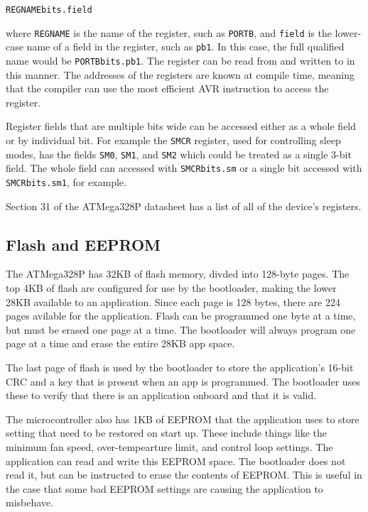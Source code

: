\documentclass{article}
\begin{document}
\texttt{REGNAMEbits.field}

where \texttt{REGNAME} is the name of the register, such as \texttt{PORTB}, and \texttt{field} is the
lower-case name of a field in the register, such as \texttt{pb1}.  In this case, the full qualified
name would be \texttt{PORTBbits.pb1}.  The register can be read from and written to in this manner.
The addresses of the registers are known at compile time, meaning that the compiler can use the most
efficient AVR instruction to access the register.

Register fields that are multiple bits wide can be accessed either as a whole field or by individual
bit.  For example the \texttt{SMCR} register, used for controlling sleep modes, has the fields
\texttt{SM0}, \texttt{SM1}, and \texttt{SM2} which could be treated as a single 3-bit field.  The
whole field can accessed with \texttt{SMCRbits.sm} or a single bit accessed with
\texttt{SMCRbits.sm1}, for example.

Section 31 of the ATMega328P datasheet has a list of all of the device's registers.

\subsection{Flash and EEPROM} \label{ssec:FWflasheeprom}
The ATMega328P has 32KB of flash memory, divded into 128-byte pages.  The top 4KB of flash are
configured for use by the bootloader, making the lower 28KB available to an application.  Since each
page is 128 bytes, there are 224 pages avilable for the application.  Flash can be programmed one
byte at a time, but must be erased one page at a time.  The bootloader will always program one page
at a time and erase the entire 28KB app space.

The last page of flash is used by the bootloader to store the application's 16-bit CRC and a key
that is present when an app is programmed.  The bootloader uses these to verify that there is an
application onboard and that it is valid.

The microcontroller also has 1KB of EEPROM that the application uses to store setting that need to
be restored on start up.  These include things like the minimum fan speed, over-tempearture limit,
and control loop settings.  The application can read and write this EEPROM space.  The bootloader
does not read it, but can be instructed to erase the contents of EEPROM.  This is useful in the case
that some bad EEPROM settings are causing the application to misbehave.
\end{document}
